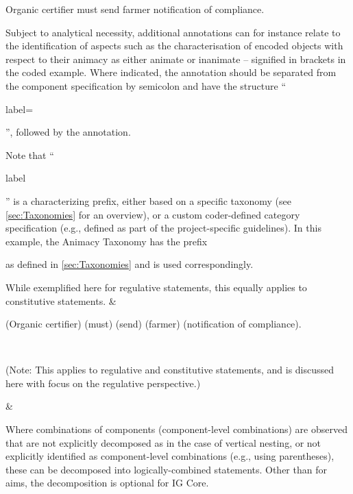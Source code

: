 \begin{landscape}
\begin{longtable}{\tabledims}
\begin{exi}Organic certifier must send farmer notification of compliance.\end{exi} 

\sp

Subject to analytical necessity, additional annotations can for instance relate to the identification of aspects such as the characterisation of encoded objects with respect to their animacy as either animate or inanimate -- signified in brackets in the coded example. Where indicated, the annotation should be separated from the component specification by semicolon and have the structure ``\begin{exi}label=\end{exi}'', followed by the annotation. 

Note that ``\begin{exi}label\end{exi}'' is a characterizing prefix, either based on a specific taxonomy (see \cref{sec:Taxonomies} for an overview), or a custom coder-defined category specification (e.g., defined as part of the project-specific guidelines). In this example, the Animacy Taxonomy has the prefix \begin{emp}\anim\end{emp} as defined in \cref{sec:Taxonomies} and is used correspondingly.

\sp

While exemplified here for regulative statements, this equally applies to constitutive statements. 
& 

\vspace{0.03cm}

\begin{exi}\A{}(Organic certifier) \D{}(must) \I{}(send) \Bind{}(farmer) \Bdir{}(notification of compliance).\end{exi} \\

\newpage

\midrule

\hypertarget{tablink:DecompositionOfComponentLevelCombinationsCoreRegulative}{\EntryDecompositionOfComponentLevelCombinations} 

\sp

(Note: This applies to regulative and constitutive statements, and is discussed here with focus on the regulative perspective.)


& {Where combinations of components (component-level combinations) are observed that are not explicitly decomposed as in the case of vertical nesting, or not explicitly identified as component-level combinations (e.g., using parentheses), these can be decomposed into logically-combined statements. Other than for aims, the decomposition is optional for IG Core. 

}
\end{longtable}
\end{landscape}
